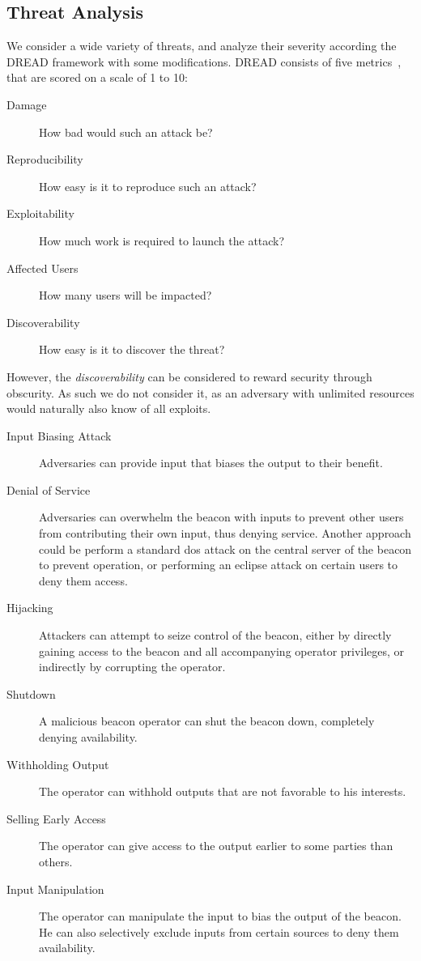 \subsection{Threat Analysis}
We consider a wide variety of threats, and analyze their severity according the DREAD framework with some modifications. DREAD consists of five metrics~\cite{dread}, that are scored on a scale of 1 to 10:
\begin{description}
    \item [Damage] How bad would such an attack be?
    \item [Reproducibility] How easy is it to reproduce such an attack?
    \item [Exploitability] How much work is required to launch the attack?
    \item [Affected Users] How many users will be impacted?
    \item [Discoverability] How easy is it to discover the threat? 
\end{description}

However, the \emph{discoverability} can be considered to reward security through obscurity. As such we do not consider it, as an adversary with unlimited resources would naturally also know of all exploits. 
\begin{description}
    \item [Input Biasing Attack] Adversaries can provide input that biases the output to their benefit. 
    \item [Denial of Service] Adversaries can overwhelm the beacon with inputs to prevent other users from contributing their own input, thus denying service. Another approach could be perform a standard \gls{dos} attack on the central server of the beacon to prevent operation, or performing an eclipse attack on certain users to deny them access. 
    \item [Hijacking] Attackers can attempt to seize control of the beacon, either by directly gaining access to the beacon and all accompanying operator privileges, or indirectly by corrupting the operator. 
    \item [Shutdown] A malicious beacon operator can shut the beacon down, completely denying availability.
    \item [Withholding Output] The operator can withhold outputs that are not favorable to his interests.
    \item [Selling Early Access] The operator can give access to the output earlier to some parties than others.
    \item [Input Manipulation] The operator can manipulate the input to bias the output of the beacon. He can also selectively exclude inputs from certain sources to deny them availability.

\end{description}
